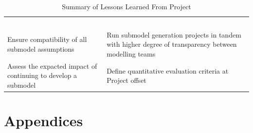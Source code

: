 \documentclass[a4paper, 10pt]{article}
\numberwithin{equation}{section}
\begin{document}
\begin{table}[]
    \label{tbl:lessons_learned}
    \caption{Summary of Lessons Learned From Project}
    \begin{tabular}{|>{\centering\arraybackslash}m{}|>{\centering\arraybackslash}m{}|}
        \hline
        \hline
        \cellcolor{gray!120}\textcolor{white}{\textbf{Lesson Learned}}&\cellcolor{gray!120}\textcolor{white}{\textbf{Suggested Preventative Measure}} \\
        Ensure compatibility of all submodel assumptions & Run submodel generation projects in tandem with higher degree of transparency between modelling teams \\
        \hline
        Assess the expacted impact of continuing to develop a submodel & Define quantitative evaluation criteria at Project offset\\
        \hline
    \end{tabular}
\end{table}






\newpage




\newpage
\appendix 
\section*{Appendices}%
\renewcommand{\thesubsection}{\Alph{subsection}}


\newpage

\newpage

\newpage

\newpage

\newpage

\newpage

\newpage

\end{document}

